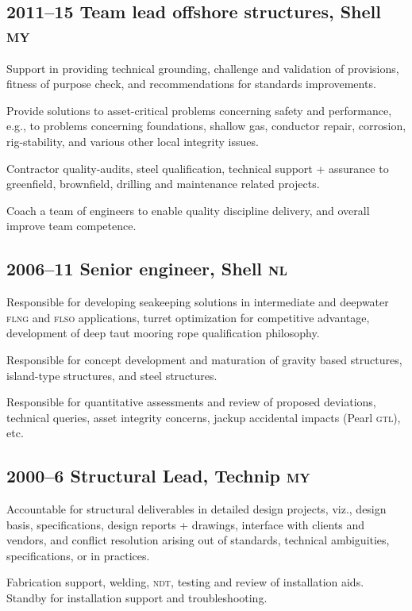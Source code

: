 \subsection*{2011--15 Team lead offshore structures, Shell \textsc{my}} %
\label{sub:c3}

Support in providing technical grounding, challenge and validation of provisions, fitness of purpose check, and recommendations for standards improvements.

Provide solutions to asset-critical problems concerning safety and performance, e.g., to problems concerning foundations, shallow gas, conductor repair, corrosion, rig-stability, and various other local integrity issues.

Contractor quality-audits, steel qualification, technical support + assurance to greenfield, brownfield, drilling and maintenance related projects. %


Coach a team of engineers to enable quality discipline delivery, and overall improve team competence.


\subsection*{2006--11 Senior engineer, Shell \textsc{nl}} %
\label{sub:c4}

Responsible for developing seakeeping solutions in intermediate and deepwater \textsc{flng} and \textsc{flso} applications, turret optimization for competitive advantage, development of deep taut mooring rope qualification philosophy.

Responsible for concept development and maturation of gravity based structures, island-type structures, and steel structures.

Responsible for quantitative assessments and review of proposed deviations, technical queries, asset integrity concerns, jackup accidental impacts (Pearl \textsc{gtl}), etc.


\subsection*{2000--6 Structural Lead, Technip \textsc{my}} %
\label{sub:c5}

Accountable for structural deliverables in detailed design projects, viz., design basis, specifications, design reports + drawings, interface with clients and vendors, and conflict resolution arising out of standards, technical ambiguities, specifications, or in practices.

Fabrication support, welding, \textsc{ndt}, testing and review of installation aids. Standby for installation support and troubleshooting.


